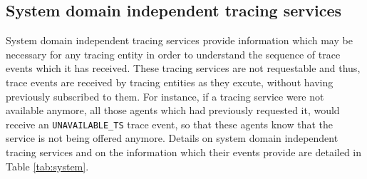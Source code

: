 		\subsection{System domain independent tracing services}

			System domain independent tracing services provide information which may be necessary
			for any tracing entity in order to understand the sequence of trace events which it has
			received. These tracing services are not requestable and thus, trace events are received by
			tracing entities as they excute, without having previously subscribed to them. For instance, if
			a tracing service were not available anymore, all those agents which had previously
			requested it, would receive an \lstinline{UNAVAILABLE_TS} trace event, so that these
			agents know that the service is not being offered anymore. Details on system domain
			independent tracing services and on the information which their events provide are detailed
			in Table \ref{tab:system}.

